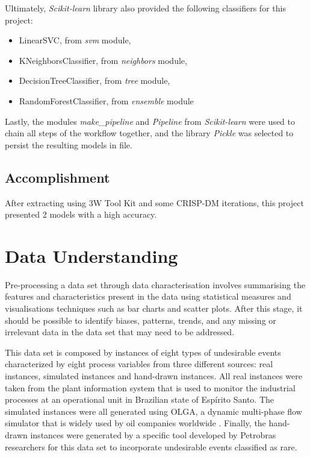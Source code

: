 \documentclass{article}
\begin{document}
Ultimately, \emph{Scikit-learn} library also provided the following classifiers for this project:
\begin{itemize}
    \item LinearSVC, from \emph{svm} module,
    \item KNeighborsClassifier, from \emph{neighbors} module,
    \item DecisionTreeClassifier, from \emph{tree} module,
    \item RandomForestClassifier, from \emph{ensemble} module
\end{itemize}

Lastly, the modules \emph{make\_pipeline} and \emph{Pipeline} from \emph{Scikit-learn} were used to chain all steps of the workflow together, and the library \emph{Pickle} was selected to persist the resulting models in file.


\subsection{Accomplishment}
After extracting using 3W Tool Kit and some CRISP-DM iterations, this project presented 2 models with a high accuracy.

\section{Data Understanding}

Pre-processing a data set through data characterisation involves summarising the features and characteristics present in the data using statistical measures and visualisations techniques such as bar charts and scatter plots. After this stage, it should be possible to identify biases, patterns, trends, and any missing or irrelevant data in the data set that may need to be addressed.

This data set is composed by instances of eight types of undesirable events characterized by eight process variables from three different sources: real instances, simulated instances and hand-drawn instances. All real instances were taken from the plant information system that is used to monitor the industrial processes at an operational unit in Brazilian state of Espírito Santo. The simulated instances were all generated using OLGA, a dynamic multi-phase flow simulator that is widely used by oil companies worldwide \parencite{andreolli2016introduccao}. Finally, the hand-drawn instances were generated by a specific tool developed by Petrobras researchers for this data set to incorporate undesirable events classified as rare.
\end{document}
